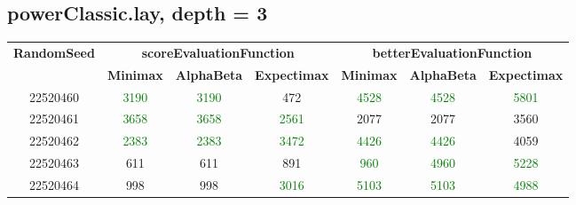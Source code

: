 \documentclass[english, a4paper,12pt]{article}
\begin{document}
\subsection*{powerClassic.lay, depth = 3}
\small\begin{tabular}{|c|c|c|c|c|c|c|}
\hline
\textbf{RandomSeed} & \multicolumn{3}{c|}{\textbf{scoreEvaluationFunction}} & \multicolumn{3}{c|}{\textbf{betterEvaluationFunction}} \\
\cline{2-7}
& \textbf{Minimax} & \textbf{AlphaBeta} & \textbf{Expectimax} & \textbf{Minimax} & \textbf{AlphaBeta} & \textbf{Expectimax} \\
\hline
22520460 & \textcolor{Green}{3190} & \textcolor{Green}{3190} & \textcolor{red!70}{472} & \textcolor{Green}{4528} & \textcolor{Green}{4528} & \textcolor{Green}{5801} \\
22520461 & \textcolor{Green}{3658} & \textcolor{Green}{3658} & \textcolor{Green}{2561} & \textcolor{red!70}{2077} & \textcolor{red!70}{2077} & \textcolor{red!70}{3560} \\
22520462 & \textcolor{Green}{2383} & \textcolor{Green}{2383} & \textcolor{Green}{3472} & \textcolor{Green}{4426} & \textcolor{Green}{4426} & \textcolor{red!70}{4059} \\
22520463 & \textcolor{red!70}{611} & \textcolor{red!70}{611} & \textcolor{red!70}{891} & \textcolor{Green}{960} & \textcolor{Green}{4960} & \textcolor{Green}{5228} \\
22520464 & \textcolor{red!70}{998} & \textcolor{red!70}{998} & \textcolor{Green}{3016} & \textcolor{Green}{5103} & \textcolor{Green}{5103} & \textcolor{Green}{4988} \\
\hline
\end{tabular}
\end{document}
